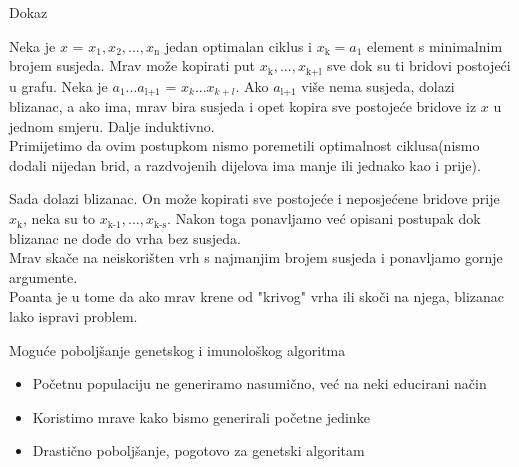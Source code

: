 \documentclass{beamer}
\begin{document}
\begin{frame}{Dokaz}

Neka je $x$ = $x_{1}, x_{2},..., x_\text{n}$ jedan optimalan ciklus i $ x_\text{k} = a_{1}$ element s minimalnim brojem susjeda.
Mrav može kopirati put $x_\text{k},...,x_\text{k+l}$ sve dok su ti bridovi postojeći u grafu. Neka je $a_{1}...a_\text{l+1}$ = $x_{k}...x_{k+l}$. Ako $a_\text{l+1}$ više nema susjeda, dolazi blizanac, a ako ima, mrav bira susjeda i opet kopira sve postojeće bridove iz $x$ u jednom smjeru. Dalje induktivno. \\
Primijetimo da ovim postupkom nismo poremetili optimalnost ciklusa(nismo dodali nijedan brid, a razdvojenih dijelova ima manje ili jednako kao i prije).

\end{frame}

\begin{frame}

Sada dolazi blizanac. On može kopirati sve postojeće i neposjećene bridove prije $x_\text{k}$, neka su to $x_\text{k-1}, ..., x_\text{k-s}$. Nakon toga ponavljamo već opisani postupak dok blizanac ne dođe do vrha bez susjeda. \\
Mrav skače na neiskorišten vrh s najmanjim brojem susjeda i ponavljamo gornje argumente. \\
Poanta je u tome da ako mrav krene od "krivog" vrha ili skoči na njega, blizanac lako ispravi problem.

\end{frame}

\begin{frame}{Moguće poboljšanje genetskog i imunološkog algoritma}

\begin{itemize}
\item Početnu populaciju ne generiramo nasumično, već na neki educirani način
\item Koristimo mrave kako bismo generirali početne jedinke
\item Drastično poboljšanje, pogotovo za genetski algoritam
 
\end{itemize}
\end{frame}
\end{document}
